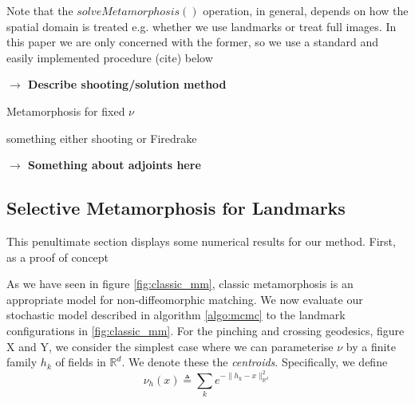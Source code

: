 \documentclass{article}
\newcommand{\Rd}{\mathbb{R}^{d}}
\begin{document}
Note that the $solveMetamorphosis()$ operation, in general, depends on how the
spatial domain is treated e.g. whether we use landmarks or treat full images.
In this paper we are only concerned with the former, so we use a standard and
easily implemented procedure (cite) below 

\textbf{$\longrightarrow$ Describe shooting/solution method}\\
\begin{algorithm}[h!]
\begin{algorithmic}
\caption{Metamorphosis for fixed $\nu$}
\State something either shooting or Firedrake
\EndProcedure
\end{algorithmic}
\end{algorithm}

\textbf{$\longrightarrow$ Something about adjoints here}\\

\subsection{Selective Metamorphosis for Landmarks}\label{sec:numerical}

This penultimate section displays some numerical results for our method. First,
as a proof of concept 

As we have seen in figure \ref{fig:classic_mm}, classic metamorphosis is an
appropriate model for non-diffeomorphic matching. We now evaluate our stochastic
model described in algorithm \ref{algo:mcmc} to the landmark configurations in
\ref{fig:classic_mm}. For the pinching and crossing geodesics, figure X and Y,
we consider the simplest case where we can parameterise $\nu$ by a finite family
$h_k$ of fields in $\Rd$. We denote these the \textit{centroids}. Specifically,
we define \begin{equation} \nu_h (x) \triangleq \sum_k e^{-\|h_k - x\|_{\Rd}^2}
\end{equation}
\end{document}
